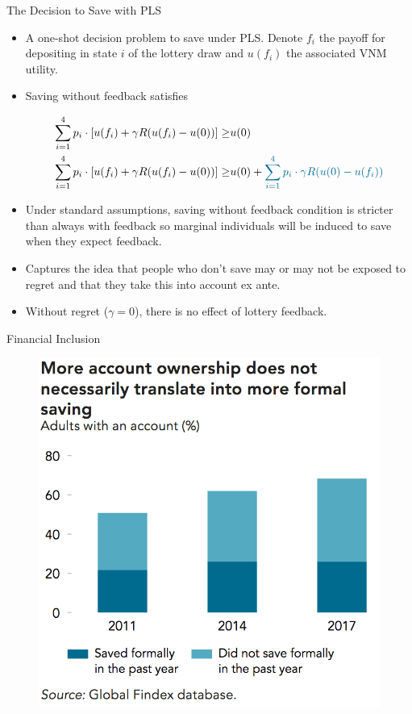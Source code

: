 \documentclass[aspectratio=169]{beamer}
\begin{document}
\begin{frame}{The Decision to Save with PLS}

	\begin{itemize}

		\item A one-shot decision problem to save under PLS. Denote $f_i$ the payoff for depositing in state $i$ of the lottery draw and $u(f_i)$ the associated VNM utility. 
	
		\item Saving without feedback satisfies

		\begin{align}
			\sum_{i=1}^4 p_i \cdot [u(f_i) + \gamma R(u(f_i) - u(0))] \geq & u(0) \\
			\sum_{i=1}^4 p_i \cdot [u(f_i) + \gamma R(u(f_i) - u(0))] \geq & u(0) + \textcolor{Triton}{ \sum_{i=1}^4 p_i \cdot \gamma R(u(0) - u(f_i)) }
		\end{align}

		\item Under standard assumptions, saving without feedback condition is stricter than always with feedback so marginal individuals will be induced to save when they expect feedback.

		\item Captures the idea that people who don't save may or may not be exposed to regret and that they take this into account ex ante.

		\item Without regret ($\gamma = 0$), there is no effect of lottery feedback.

	\end{itemize}

\end{frame}

\begin{frame}{Financial Inclusion}

	\begin{figure}[H]
		\centering
		\includegraphics[width=0.45\linewidth]{fig-findex.png}
	\end{figure}

\end{frame}
\end{document}

